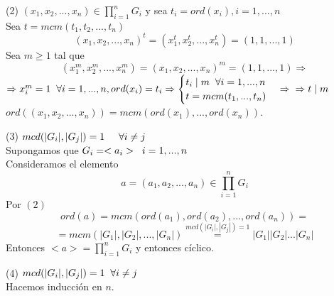 \documentclass[11pt,a4paper]{article}
\begin{document}
\begin{enumerate*}
\item[(2)] $(x_{1}, x_{2}, ..., x_{n}) \in \prod_{i=1}^{n} G_{i}$ y sea $t_{i} = ord(x_{i}), i = 1, ..., n$ \\
Sea $t = mcm(t_{1}, t_{2}, ..., t_{n})$
$$(x_{1}, x_{2}, ..., x_{n})^{t} = (x_{1}^{t}, x_{2}^{t}, ..., x_{n}^{t}) = (1, 1, ..., 1)$$
Sea $m \geq 1$ tal que
$$ (x_{1}^{m}, x_{2}^{m}, ..., x_{n}^{m}) = (x_{1}, x_{2}, ..., x_{n})^{m} = (1, 1, ..., 1) \Rightarrow$$
$\Rightarrow x_{i}^{m} = 1 \hspace{0.2cm} \forall i = 1, ..., n, ord(x_{i}) = t_{i} \Rightarrow
\begin{cases}
t_{i} \mid m \hspace{0.2cm} \forall i = 1, ..., n \\
t = mcm(t_{1}, ..., t_{n}) 
\end{cases}
\Rightarrow \\ \Rightarrow t \mid m$ \\
$ord((x_{1}, x_{2}, ..., x_{n})) = mcm(ord(x_{1}), ..., ord(x_{n}))$.
\item[(3)] $mcd(|G_{i}|, |G_{j}|) = 1 \hspace{0.5cm} \forall i \neq j$ \\
Supongamos que $G_{i} = <a_{i}> \hspace{0.2cm} i = 1, ..., n$ \\
Consideramos el elemento
$$a = (a_{1}, a_{2}, ..., a_{n}) \in \prod_{i=1}^{n} G_{i}$$
Por $(2)$
$$ord(a) = mcm(ord(a_{1}), ord(a_{2}), ..., ord(a_{n})) =$$ $$=mcm(|G_{1}|, |G_{2}|, ..., |G_{n}|) \overset{mcd(|G_{i}|, |G_{j}|) = 1}{=} |G_{1}| |G_{2}| ... |G_{n}|$$
Entonces $<a> = \prod_{i=1}^{n} G_{i}$ y entonces cíclico.
\item[(4)] $mcd(|G_{i}|,|G_{j}|) = 1 \hspace{0.2cm} \forall i \neq j$ \\
Hacemos inducción en $n$.


\end{enumerate*}
\end{document}

